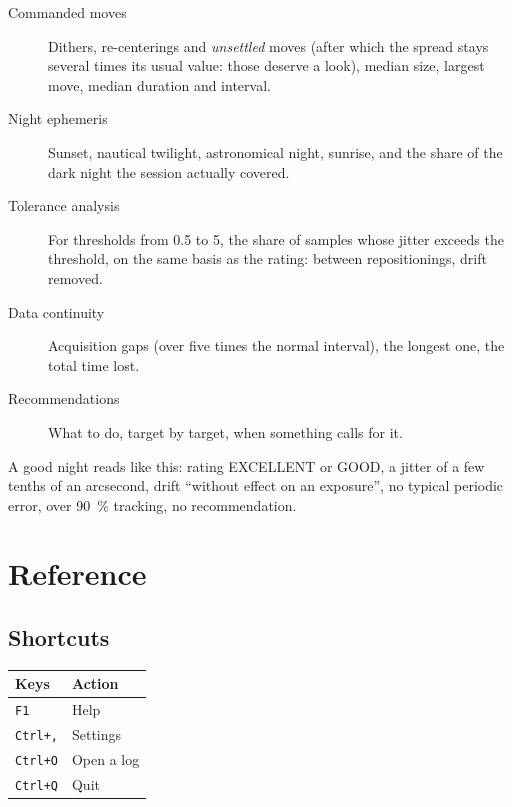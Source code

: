 \begin{description}
  \item[Commanded moves] Dithers, re-centerings and \emph{unsettled} moves
  (after which the spread stays several times its usual value: those deserve a
  look), median size, largest move, median duration and interval.

  \item[Night ephemeris] Sunset, nautical twilight, astronomical night,
  sunrise, and the share of the dark night the session actually covered.

  \item[Tolerance analysis] For thresholds from 0.5 to 5\arcsec, the share of
  samples whose jitter exceeds the threshold, on the same basis as the rating:
  between repositionings, drift removed.

  \item[Data continuity] Acquisition gaps (over five times the normal
  interval), the longest one, the total time lost.

  \item[Recommendations] What to do, target by target, when something calls
  for it.
\end{description}

\begin{tip}
A good night reads like this: rating EXCELLENT or GOOD, a jitter of a few
tenths of an arcsecond, drift ``without effect on an exposure'', no typical
periodic error, over 90~\% tracking, no recommendation.
\end{tip}

\chapter{Reference}
\label{ch:ref}

\section{Shortcuts}

\begin{center}
\begin{tabularx}{\textwidth}{lX}
\toprule
\textbf{Keys} & \textbf{Action} \\
\midrule
\texttt{F1} & Help \\
\texttt{Ctrl+,} & Settings \\
\texttt{Ctrl+O} & Open a log \\
\texttt{Ctrl+Q} & Quit \\
\bottomrule
\end{tabularx}
\end{center}

